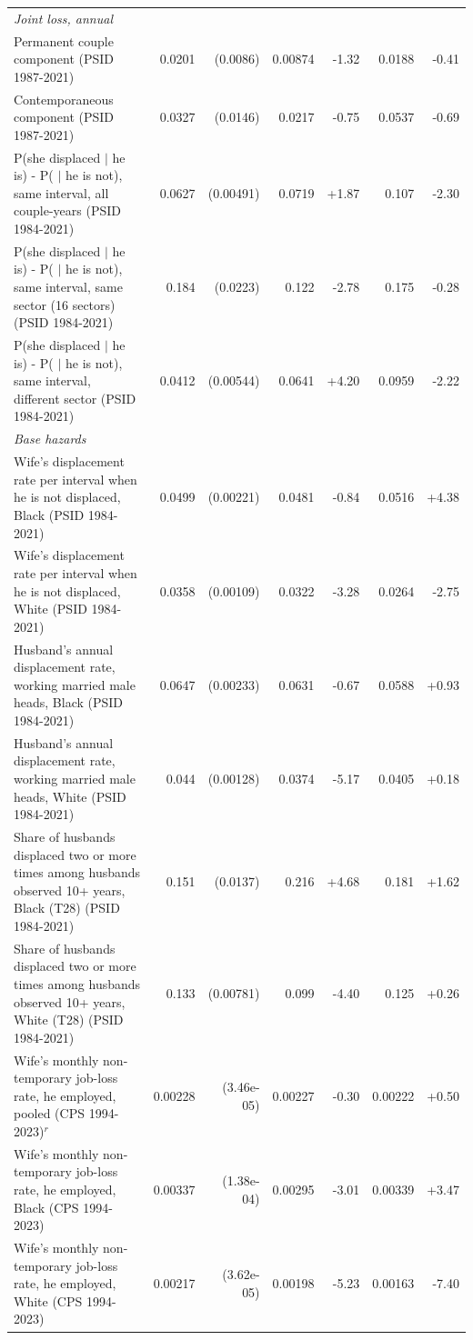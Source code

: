 {\begin{longtable}{p{6.4cm}rrrrrr}
\multicolumn{7}{l}{\textit{Joint loss, annual}} \\
Permanent couple component (PSID 1987-2021) & 0.0201 & (0.0086) & 0.00874 & -1.32 & 0.0188 & -0.41 \\
Contemporaneous component (PSID 1987-2021) & 0.0327 & (0.0146) & 0.0217 & -0.75 & 0.0537 & -0.69 \\
P(she displaced $|$ he is) - P( $|$ he is not), same interval, all couple-years (PSID 1984-2021) & 0.0627 & (0.00491) & 0.0719 & +1.87 & 0.107 & -2.30 \\
P(she displaced $|$ he is) - P( $|$ he is not), same interval, same sector (16 sectors) (PSID 1984-2021) & 0.184 & (0.0223) & 0.122 & -2.78 & 0.175 & -0.28 \\
P(she displaced $|$ he is) - P( $|$ he is not), same interval, different sector (PSID 1984-2021) & 0.0412 & (0.00544) & 0.0641 & +4.20 & 0.0959 & -2.22 \\
\multicolumn{7}{l}{\textit{Base hazards}} \\
Wife's displacement rate per interval when he is not displaced, Black (PSID 1984-2021) & 0.0499 & (0.00221) & 0.0481 & -0.84 & 0.0516 & +4.38 \\
Wife's displacement rate per interval when he is not displaced, White (PSID 1984-2021) & 0.0358 & (0.00109) & 0.0322 & -3.28 & 0.0264 & -2.75 \\
Husband's annual displacement rate, working married male heads, Black (PSID 1984-2021) & 0.0647 & (0.00233) & 0.0631 & -0.67 & 0.0588 & +0.93 \\
Husband's annual displacement rate, working married male heads, White (PSID 1984-2021) & 0.044 & (0.00128) & 0.0374 & -5.17 & 0.0405 & +0.18 \\
Share of husbands displaced two or more times among husbands observed 10+ years, Black (T28) (PSID 1984-2021) & 0.151 & (0.0137) & 0.216 & +4.68 & 0.181 & +1.62 \\
Share of husbands displaced two or more times among husbands observed 10+ years, White (T28) (PSID 1984-2021) & 0.133 & (0.00781) & 0.099 & -4.40 & 0.125 & +0.26 \\
Wife's monthly non-temporary job-loss rate, he employed, pooled (CPS 1994-2023)$^{r}$ & 0.00228 & (3.46e-05) & 0.00227 & -0.30 & 0.00222 & +0.50 \\
Wife's monthly non-temporary job-loss rate, he employed, Black (CPS 1994-2023) & 0.00337 & (1.38e-04) & 0.00295 & -3.01 & 0.00339 & +3.47 \\
Wife's monthly non-temporary job-loss rate, he employed, White (CPS 1994-2023) & 0.00217 & (3.62e-05) & 0.00198 & -5.23 & 0.00163 & -7.40 \\

\end{longtable}}
